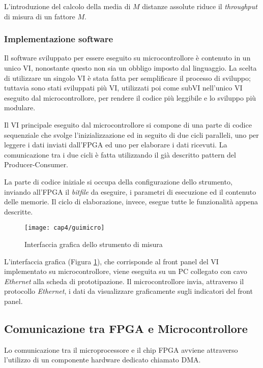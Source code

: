 L'introduzione del calcolo della media di $M$ distanze assolute riduce il \textit{throughput} di misura di un fattore $M$. 

\subsubsection{Implementazione software}
Il software sviluppato per essere eseguito su microcontrollore è contenuto in un unico VI, nonostante questo non sia un obbligo imposto dal linguaggio. La scelta di utilizzare un singolo VI è stata fatta per semplificare il processo di sviluppo; tuttavia sono stati sviluppati più VI, utilizzati poi come subVI nell'unico VI eseguito dal microcontrollore, per rendere il codice più leggibile e lo sviluppo più modulare.

Il VI principale eseguito dal microcontrollore si compone di una parte di codice sequenziale che svolge l'inizializzazione ed in seguito di due cicli paralleli, uno per leggere i dati inviati dall'FPGA ed uno per elaborare i dati ricevuti. La comunicazione tra i due cicli è fatta utilizzando il già descritto pattern del Producer-Consumer.

La parte di codice iniziale si occupa della configurazione dello strumento, inviando all'FPGA il \textit{bitfile} da eseguire, i parametri di esecuzione ed il contenuto delle memorie. Il ciclo di elaborazione, invece, esegue tutte le funzionalità appena descritte.

\begin{figure}[H]  
  \begin{center}
    \texttt{[image: cap4/guimicro]}
    \caption{Interfaccia grafica dello strumento di misura}
    \label{guimicro}
  \end{center}
\end{figure} 

L'interfaccia grafica (Figura \ref{guimicro}), che corrisponde al front panel del VI implementato su microcontrollore, viene eseguita su un PC collegato con cavo \textit{Ethernet} alla scheda di prototipazione. Il microcontrollore invia, attraverso il protocollo \textit{Ethernet}, i dati da visualizzare graficamente sugli indicatori del front panel.

\subsection{Comunicazione tra FPGA e Microcontrollore}
Lo comunicazione tra il microprocessore e il chip FPGA avviene attraverso l'utilizzo di un componente hardware dedicato chiamato DMA.

